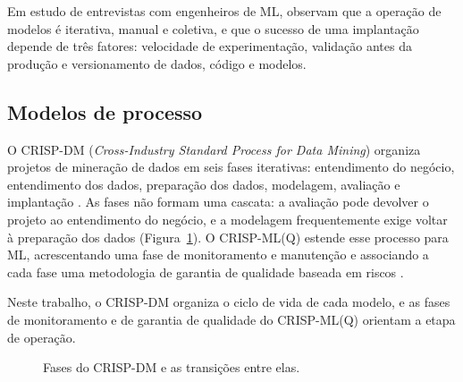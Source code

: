 Em estudo de entrevistas com engenheiros de ML,  observam que a operação de modelos é iterativa, manual e coletiva, e que o sucesso de uma implantação depende de três fatores: velocidade de experimentação, validação antes da produção e versionamento de dados, código e modelos.

\subsection{Modelos de processo}

O CRISP-DM (\textit{Cross-Industry Standard Process for Data Mining}) organiza projetos de mineração de dados em seis fases iterativas: entendimento do negócio, entendimento dos dados, preparação dos dados, modelagem, avaliação e implantação \cite{wirth2000}. As fases não formam uma cascata: a avaliação pode devolver o projeto ao entendimento do negócio, e a modelagem frequentemente exige voltar à preparação dos dados (Figura~\ref{fig:crispdm}). O CRISP-ML(Q) estende esse processo para ML, acrescentando uma fase de monitoramento e manutenção e associando a cada fase uma metodologia de garantia de qualidade baseada em riscos \cite{studer2021}.

Neste trabalho, o CRISP-DM organiza o ciclo de vida de cada modelo, e as fases de monitoramento e de garantia de qualidade do CRISP-ML(Q) orientam a etapa de operação.

\begin{figure}[htbp]
	\centering
	\caption{Fases do CRISP-DM e as transições entre elas.}
	\label{fig:crispdm}
\end{figure}

